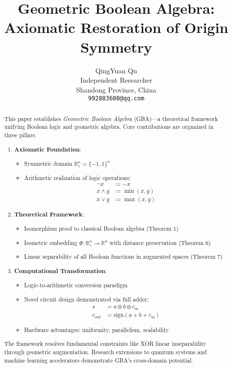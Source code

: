 \documentclass{article}
\title{Geometric Boolean Algebra: Axiomatic Restoration of Origin Symmetry}
\author{
    QingYuan Qu\\
  Independent Researcher\\
    Shandong Province, China \\
  \texttt{992883600@qq.com} 
}
\begin{document}
\maketitle

\begin{abstract}
This paper establishes \emph{Geometric Boolean Algebra} (GBA)---a theoretical framework unifying Boolean logic and geometric algebra. Core contributions are organized in three pillars:

\begin{enumerate}
\item \textbf{Axiomatic Foundation}:
\begin{itemize}
\item Symmetric domain $\mathbb{B}_s^n = \{-1,1\}^n$
\item Arithmetic realization of logic operations:
\begin{align*}
\neg x &\coloneqq -x \\
x \land y &\coloneqq \min(x,y) \\
x \lor y &\coloneqq \max(x,y)
\end{align*}
\end{itemize}

\item \textbf{Theoretical Framework}:
\begin{itemize}
\item Isomorphism proof to classical Boolean algebra (Theorem 1)
\item Isometric embedding $\Phi: \mathbb{B}_s^n \to \mathbb{R}^n$ with distance preservation (Theorem 6)
\item Linear separability of all Boolean functions in augmented spaces (Theorem 7)
\end{itemize}

\item \textbf{Computational Transformation}:
\begin{itemize}
\item Logic-to-arithmetic conversion paradigm
\item Novel circuit design demonstrated via full adder:
\begin{align*}
s &= a \otimes b \otimes c_{\text{in}} \\
c_{\text{out}} &= \mathrm{sign}(a+b+c_{\text{in}})
\end{align*}
\item Hardware advantages: uniformity, parallelism, scalability
\end{itemize}
\end{enumerate}

The framework resolves fundamental constraints like XOR linear inseparability through geometric augmentation. Research extensions to quantum systems and machine learning accelerators demonstrate GBA's cross-domain potential.
\end{abstract}
\end{document}
